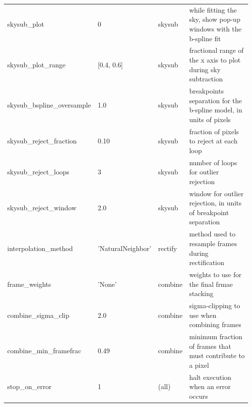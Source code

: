 \documentclass[a4paper]{article}
\begin{document}
\begin{sloppypar}
\begin{table}
{\begin{tabular}{llll}
    skysub\_plot                  & 0             & skysub           & while fitting the sky, show pop-up windows with the b-spline fit \\
    skysub\_plot\_range           & [0.4, 0.6]    & skysub           & fractional range of the x axis to plot during sky subtraction \\
    skysub\_bspline\_oversample   & 1.0           & skysub           & breakpoints separation for the b-spline model, in units of pixels \\
    skysub\_reject\_fraction      & 0.10          & skysub           & fraction of pixels to reject at each loop \\
    skysub\_reject\_loops         & 3             & skysub           & number of loops for outlier rejection \\
    skysub\_reject\_window        & 2.0           & skysub           & window for outlier rejection, in units of breakpoint separation \\
    interpolation\_method         & 'NaturalNeighbor'  & rectify     & method used to resample frames during rectification \\
    frame\_weights                & 'None'        & combine          & weights to use for the final frmae stacking \\
    combine\_sigma\_clip          & 2.0           & combine          & sigma-clipping to use when combining frames \\
    combine\_min\_framefrac       & 0.49          & combine          & minimum fraction of frames that must contribute to a pixel \\
    stop\_on\_error               & 1             & (all)            & halt execution when an error occurs \\
    \hline
  \end{tabular}
  }
\end{table}








\end{sloppypar}
\end{document}
